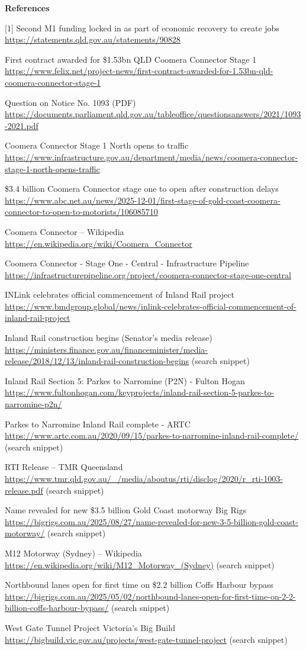 \documentclass{llmxive}
\begin{document}
\begin{tcolorbox}
\smallskip\noindent\textbf{References}\par\footnotesize
[1] Second M1 funding locked in as part of economic recovery to create jobs \url{https://statements.qld.gov.au/statements/90828}\par
[2] First contract awarded for \$1.53bn QLD Coomera Connector Stage 1 \url{https://www.felix.net/project-news/first-contract-awarded-for-1.53bn-qld-coomera-connector-stage-1}\par
[3] Question on Notice No. 1093 (PDF) \url{https://documents.parliament.qld.gov.au/tableoffice/questionsanswers/2021/1093-2021.pdf}\par
[4] Coomera Connector Stage 1 North opens to traffic \url{https://www.infrastructure.gov.au/department/media/news/coomera-connector-stage-1-north-opens-traffic}\par
[5] \$3.4 billion Coomera Connector stage one to open after construction delays \url{https://www.abc.net.au/news/2025-12-01/first-stage-of-gold-coast-coomera-connector-to-open-to-motorists/106085710}\par
[6] Coomera Connector -- Wikipedia \url{https://en.wikipedia.org/wiki/Coomera_Connector}\par
[7] Coomera Connector - Stage One - Central - Infrastructure Pipeline \url{https://infrastructurepipeline.org/project/coomera-connector-stage-one-central}\par
[8] INLink celebrates official commencement of Inland Rail project \url{https://www.bmdgroup.global/news/inlink-celebrates-official-commencement-of-inland-rail-project}\par
[9] Inland Rail construction begins (Senator's media release) \url{https://ministers.finance.gov.au/financeminister/media-release/2018/12/13/inland-rail-construction-begins} (search snippet)\par
[10] Inland Rail Section 5: Parkes to Narromine (P2N) - Fulton Hogan \url{https://www.fultonhogan.com/keyprojects/inland-rail-section-5-parkes-to-narromine-p2n/}\par
[11] Parkes to Narromine Inland Rail complete - ARTC \url{https://www.artc.com.au/2020/09/15/parkes-to-narromine-inland-rail-complete/} (search snippet)\par
[12] RTI Release -- TMR Queensland \url{https://www.tmr.qld.gov.au/_/media/aboutus/rti/disclog/2020/r_rti-1003-release.pdf} (search snippet)\par
[13] Name revealed for new \$3.5 billion Gold Coast motorway Big Rigs \url{https://bigrigs.com.au/2025/08/27/name-revealed-for-new-3-5-billion-gold-coast-motorway/} (search snippet)\par
[14] M12 Motorway (Sydney) -- Wikipedia \url{https://en.wikipedia.org/wiki/M12_Motorway_(Sydney)} (search snippet)\par
[15] Northbound lanes open for first time on \$2.2 billion Coffs Harbour bypass \url{https://bigrigs.com.au/2025/05/02/northbound-lanes-open-for-first-time-on-2-2-billion-coffs-harbour-bypass/} (search snippet)\par
[16] West Gate Tunnel Project Victoria's Big Build \url{https://bigbuild.vic.gov.au/projects/west-gate-tunnel-project} (search snippet)
\end{tcolorbox}
\end{document}
